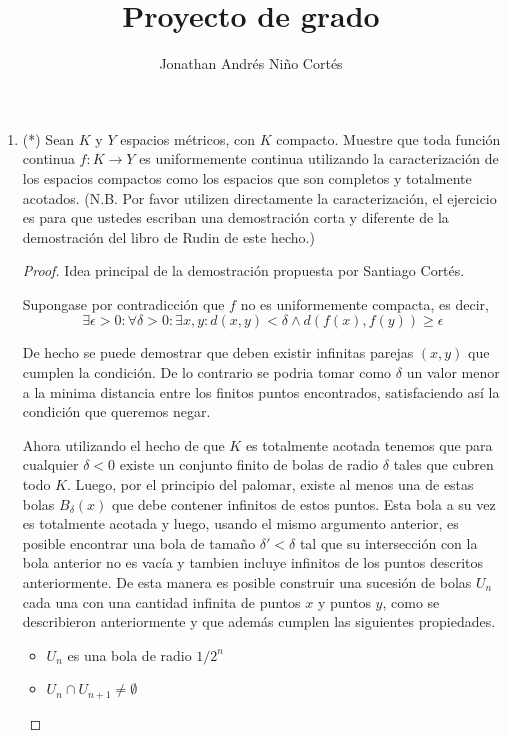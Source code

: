 \documentclass[letter,twoside,12pt]{article}
\title{Proyecto de grado}
\author{Jonathan Andrés Niño Cortés}
\begin{document}
\maketitle

\begin{enumerate}
\item (*) Sean $K$ y $Y$ espacios métricos, con $K$ compacto. Muestre que toda función continua $f : K \rightarrow Y$ es uniformemente continua utilizando la caracterización de los espacios compactos como los espacios que son completos y totalmente acotados. (N.B. Por favor utilizen directamente la caracterización, el ejercicio es para que ustedes escriban una demostración corta y diferente de la demostración del libro de Rudin de este hecho.)

\begin{proof}
Idea principal de la demostración propuesta por Santiago Cortés.

Supongase por contradicción que $f$ no es uniformemente compacta, es decir, $$\exists \epsilon > 0 : \forall \delta > 0 : \exists x, y : d(x,y)<\delta \wedge d(f(x),f(y))\geq \epsilon $$ 

De hecho se puede demostrar que deben existir infinitas parejas $(x,y)$ que cumplen la condición. De lo contrario se podria tomar como $\delta$ un valor menor a la minima distancia entre los finitos puntos encontrados, satisfaciendo así la condición que queremos negar.

Ahora utilizando el hecho de que $K$ es totalmente acotada tenemos que para cualquier $\delta<0$ existe un conjunto finito de bolas de radio $\delta$ tales que cubren todo $ K $. Luego, por el principio del palomar, existe al menos una de estas bolas $B_{\delta}(x)$ que debe contener infinitos de estos puntos. Esta bola a su vez es totalmente acotada y luego, usando el mismo argumento anterior, es posible encontrar una bola de tamaño $\delta' < \delta$ tal que su intersección con la bola anterior no es vacía y tambien incluye infinitos de los puntos descritos anteriormente. De esta manera es posible construir una sucesión de bolas $ U_n$ cada una con una cantidad infinita de puntos $x$ y puntos $y$, como se describieron anteriormente y que además cumplen las siguientes propiedades.

\begin{itemize}

\item $ U_n $ es una bola de radio $ 1/2^n $
\item $ U_n \cap U_{n+1} \not = \emptyset $


\end{itemize}
\end{proof}
\end{enumerate}
\end{document}
